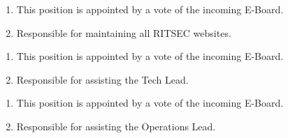 


\begin{enumerate}
  \item This position is appointed by a vote of the incoming E-Board. 
  \item Responsible for maintaining all RITSEC websites.
\end{enumerate}


\begin{enumerate}
  \item This position is appointed by a vote of the incoming E-Board.
  \item Responsible for assisting the Tech Lead.
\end{enumerate}


\begin{enumerate}
  \item This position is appointed by a vote of the incoming E-Board.
  \item Responsible for assisting the Operations Lead.
\end{enumerate}
